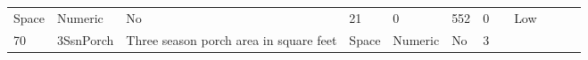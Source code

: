 \documentclass[11pt]{article}
\begin{document}
\begin{longtable}[]{@{}llllllllllll@{}}
\begin{minipage}[t]{0.04\columnwidth}
Space\strut
\end{minipage} & \begin{minipage}[t]{0.04\columnwidth}\raggedright\strut
Numeric\strut
\end{minipage} & \begin{minipage}[t]{0.04\columnwidth}\raggedright\strut
No\strut
\end{minipage} & \begin{minipage}[t]{0.04\columnwidth}\raggedright\strut
21\strut
\end{minipage} & \begin{minipage}[t]{0.04\columnwidth}\raggedright\strut
0\strut
\end{minipage} & \begin{minipage}[t]{0.04\columnwidth}\raggedright\strut
552\strut
\end{minipage} & \begin{minipage}[t]{0.04\columnwidth}\raggedright\strut
0\strut
\end{minipage} & \begin{minipage}[t]{0.04\columnwidth}\raggedright\strut
\strut
\end{minipage} & \begin{minipage}[t]{0.04\columnwidth}\raggedright\strut
Low\strut
\end{minipage}\tabularnewline
\begin{minipage}[t]{0.04\columnwidth}\raggedright\strut
70\strut
\end{minipage} & \begin{minipage}[t]{0.04\columnwidth}\raggedright\strut
3SsnPorch\strut
\end{minipage} & \begin{minipage}[t]{0.04\columnwidth}\raggedright\strut
Three season porch area in square feet\strut
\end{minipage} & \begin{minipage}[t]{0.04\columnwidth}\raggedright\strut
Space\strut
\end{minipage} & \begin{minipage}[t]{0.04\columnwidth}\raggedright\strut
Numeric\strut
\end{minipage} & \begin{minipage}[t]{0.04\columnwidth}\raggedright\strut
No\strut
\end{minipage} & \begin{minipage}[t]{0.04\columnwidth}\raggedright\strut
3\strut
\end{minipage} & \begin{minipage}[t]{0.04\columnwidth}\raggedright\strut

\end{minipage}
\end{longtable}
\end{document}
